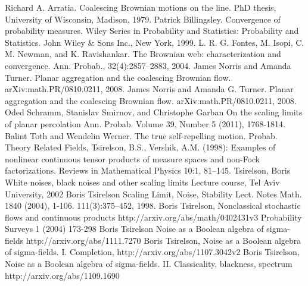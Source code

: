 \begin{thebibliography}{99}
 Richard A. Arratia. Coalescing Brownian motions on
  the line. PhD thesis, University of Wisconsin, Madison, 1979.
 Patrick Billingsley. Convergence of probability
  measures. Wiley Series in Probability and Statistics: Probability
  and Statistics. John Wiley \& Sons Inc., New York, 1999.
 L. R. G. Fontes, M. Isopi, C. M. Newman, and
  K. Ravishankar. The Brownian web: characterization and
  convergence. Ann. Probab., 32(4):2857--2883, 2004.
 James Norris and Amanda
  Turner. Planar aggregation and the coalescing Brownian flow.
  arXiv:math.PR/0810.0211, 2008.
 James Norris and Amanda
  G. Turner. Planar aggregation and the coalescing Brownian
  flow. arXiv:math.PR/0810.0211, 2008.
  Oded Schramm, Stanislav Smirnov, and Christophe Garban
  On the scaling limits of planar percolation
  Ann. Probab. Volume 39, Number 5 (2011), 1768-1814.
 Balint Toth and Wendelin Werner. The true
  self-repelling motion. Probab. Theory Related Fields,
  Tsirelson, B.S., Vershik, A.M. (1998): Examples of nonlinear continuous
  tensor products of measure spaces and non-Fock factorizations. Reviews
  in Mathematical Physics 10:1, 81--145.
  Tsirelson, Boris
  White noises, black noises and other scaling limits
  Lecture course, Tel Aviv University, 2002
  Boris Tsirelson
  Scaling Limit, Noise, Stability
  Lect. Notes Math. 1840 (2004), 1-106.
  111(3):375--452, 1998.
 Boris Tsirelson,
  Nonclassical stochastic flows and continuous products
  http://arxiv.org/abs/math/0402431v3
  Probability Surveys 1 (2004) 173-298
  Boris Tsirelson
  Noise as a Boolean algebra of sigma-fields
  http://arxiv.org/abs/1111.7270
 Boris Tsirelson, Noise as a Boolean
  algebra of sigma-fields. I. Completion, http://arxiv.org/abs/1107.3042v2
 Boris Tsirelson,
  Noise as a Boolean algebra of sigma-fields. II. Classicality,
  blackness, spectrum
  http://arxiv.org/abs/1109.1690
\end{thebibliography}
